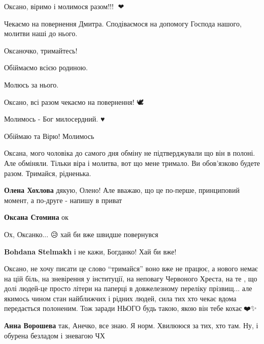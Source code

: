 Оксано, віримо і молимося разом!!! 🙏❤


Чекаємо на повернення Дмитра. Сподіваємося на допомогу Господа нашого, молитви наші до нього.


Оксаночко, тримайтесь!

Обіймаємо всією родиною.

Молюсь за нього.


Оксано, всі разом чекаємо на повернення! 🕊


Молимось - Бог милосердний. ♥


Обіймаю та Вірю! Молимось


Оксана, мого чоловіка до самого дня обміну не підтверджували що він в полоні.
Але обміняли. Тільки віра і молитва, вот що мене тримало. Ви обов'язково будете
разом. Тримайся, рідненька.

\begin{itemize} %
\textbf{Олена Хохлова} дякую, Олено! Але вважаю, що це по-перше, принциповий момент, а по-друге - напишу в приват

\textbf{Оксана Стомина} ок

\end{itemize} %


Ох, Оксанко... 😥 хай би вже швидше повернувся

\begin{itemize} %
\textbf{Bohdana Stelmakh} і не кажи, Богданко! Хай би вже!
\end{itemize} %


Оксано, не хочу писати це слово \enquote{тримайся} воно вже не працює, а нового немає
на цій біль, на зневірення у інституції, на неповагу Червоного Хреста, на те ,
що долі людей-це просто літери на паперці в довжелезному переліку прізвищ... але
якимось чином стан найближчих і рідних людей, сила тих хто чекає вдома
передається полоненим. Тож заради НЬОГО будь такою, якою він тебе кохає🫶❤️✨

\begin{itemize} %
\textbf{Анна Ворошева} так, Анечко, все знаю. Я норм. Хвилююся за тих, хто там. Ну, і обурена безладом і зневагою ЧХ
\end{itemize} %

